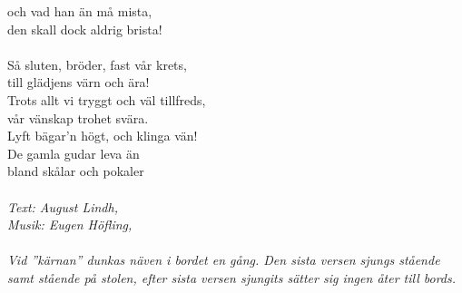 och vad han än må mista,\\
den skall dock aldrig brista!\\
\\
Så sluten, bröder, fast vår krets,\\
till glädjens värn och ära!\\
Trots allt vi tryggt och väl tillfreds,\\
vår vänskap trohet svära.\\
Lyft bägar’n högt, och klinga vän!\\
De gamla gudar leva än\\
\revrpt bland skålar och pokaler\rpt\\
\\
{\footnotesize\textit{Text: August Lindh, \\ Musik:
Eugen Höfling, \\
\\
Vid ”kärnan” dunkas näven i bordet en gång. Den sista versen sjungs
stående samt stående på stolen, efter sista versen sjungits sätter sig
ingen åter till bords.}}
